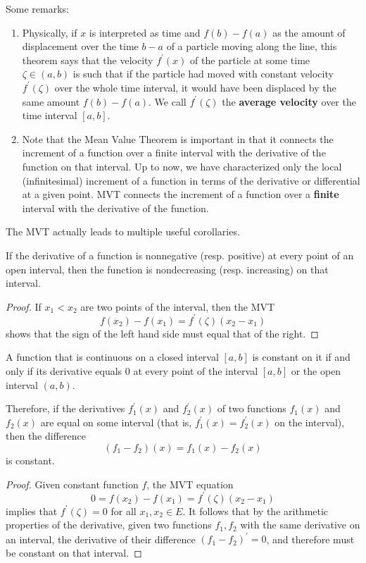     Some remarks: 
    \begin{enumerate}
      \item Physically, if $x$ is interpreted as time and $f(b) - f(a)$ as the amount of displacement over the time $b-a$ of a particle moving along the line, this theorem says that the velocity $f^\prime (x)$ of the particle at some time $\zeta \in (a, b)$ is such that if the particle had moved with constant velocity $f^\prime (\zeta)$ over the whole time interval, it would have been displaced by the same amount $f(b) - f(a)$. We call $f^\prime (\zeta)$ the \textbf{average velocity} over the time interval $[a, b]$. 
      \item Note that the Mean Value Theorem is important in that it connects the increment of a function over a finite interval with the derivative of the function on that interval. Up to now, we have characterized only the local (infinitesimal) increment of a function in terms of the derivative or differential at a given point. MVT connects the increment of a function over a \textbf{finite} interval with the derivative of the function. 
    \end{enumerate}

    The MVT actually leads to multiple useful corollaries. 

    \begin{corollary}
    If the derivative of a function is nonnegative (resp. positive) at every point of an open interval, then the function is nondecreasing (resp. increasing) on that interval. 
    \end{corollary}
    \begin{proof}
    If $x_1 < x_2$ are two points of the interval, then the MVT
    \[f(x_2) - f(x_1) = f^\prime (\zeta) (x_2 - x_1)\]
    shows that the sign of the left hand side must equal that of the right. 
    \end{proof}

    \begin{corollary}
    A function that is continuous on a closed interval $[a,b]$ is constant on it if and only if its derivative equals $0$ at every point of the interval $[a,b]$ or the open interval $(a, b)$. 

    Therefore, if the derivatives $f_1^\prime (x)$ and $f_2^\prime (x)$ of two functions $f_1 (x)$ and $f_2 (x)$ are equal on some interval (that is, $f_1^\prime (x) = f_2^\prime (x)$ on the interval), then the difference
    \[(f_1 - f_2) (x) = f_1 (x) - f_2 (x)\]
    is constant. 
    \end{corollary}
    \begin{proof}
    Given constant function $f$, the MVT equation 
    \[0 = f(x_2) - f(x_1) = f^\prime (\zeta) (x_2 - x_1)\]
    implies that $f^\prime (\zeta) = 0$ for all $x_1, x_2 \in E$. It follows that by the arithmetic properties of the derivative, given two functions $f_1, f_2$ with the same derivative on an interval, the derivative of their difference $(f_1 - f_2)^\prime = 0$, and therefore must be constant on that interval. 
    \end{proof}

